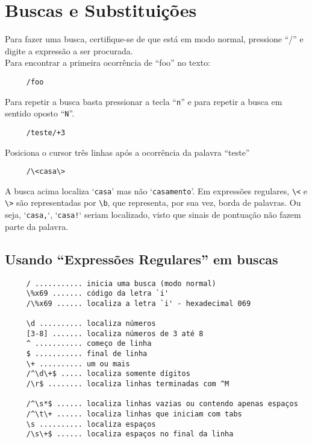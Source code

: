 
\chapter{Buscas e Substituições}\label{cha:Buscas e substituições}

Para fazer uma busca, certifique-se de que está em modo normal,
pressione ``/'' e digite a expressão a ser procurada. \\


Para encontrar a primeira ocorrência de ``foo'' no texto:

\begin{verbatim}
     /foo
\end{verbatim}

Para repetir a busca basta pressionar a tecla ``\verb+n+'' e para
repetir a busca em sentido oposto ``\verb+N+''.

\begin{verbatim}
     /teste/+3
\end{verbatim}

Posiciona o cursor três linhas após a ocorrência da palavra ``teste'' \\

\begin{verbatim}
     /\<casa\>
\end{verbatim}

A busca acima localiza `{\tt casa}' mas não `{\tt casamento}'. Em expressões
regulares, \verb|\<| e \verb|\>| são representadas por \verb|\b|, que representa, por sua vez, borda
de palavras. Ou seja, `{\tt casa,}`, `{\tt casa!}` seriam localizado, visto que sinais
de pontuação não fazem parte da palavra.


\section{Usando ``Expressões Regulares'' em buscas}

\begin{verbatim}
     / ........... inicia uma busca (modo normal)
     \%x69 ....... código da letra `i'
     /\%x69 ...... localiza a letra `i' - hexadecimal 069

     \d .......... localiza números
     [3-8] ....... localiza números de 3 até 8
     ^ ........... começo de linha
     $ ........... final de linha
     \+ .......... um ou mais
     /^\d\+$ ..... localiza somente dígitos
     /\r$ ........ localiza linhas terminadas com ^M

     /^\s*$ ...... localiza linhas vazias ou contendo apenas espaços
     /^\t\+ ...... localiza linhas que iniciam com tabs
     \s .......... localiza espaços
     /\s\+$ ...... localiza espaços no final da linha
\end{verbatim}

